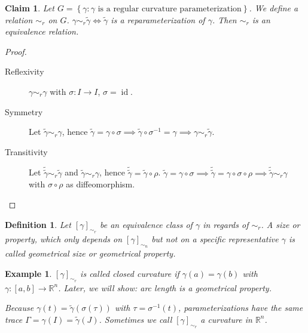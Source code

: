 \documentclass{article}
\newtheorem{example}{Example}  \numberwithin{example}{section}
\newtheorem{definition}{Definition}  \numberwithin{definition}{section}
\newtheorem*{claim}{Claim}%
\newcommand{\set}[1]{\left\{#1\right\}}
\begin{document}
\begin{claim}
  Let $G = \set{\gamma: \gamma \text{ is a regular curvature parameterization}}$.
  We define a relation $\sim_{r}$ on $G$. $\gamma \sim_r \tilde\gamma \iff \tilde\gamma$ is a reparameterization of $\gamma$.
  Then $\sim_r$ is an equivalence relation.
\end{claim}
\begin{proof}
  \begin{description}
    \item[Reflexivity]
      $\gamma \sim_r \gamma$ with $\sigma: I \to I$, $\sigma = \operatorname{id}$. 
    \item[Symmetry]
      Let $\tilde\gamma \sim_r \gamma$, hence $\tilde\gamma = \gamma \circ \sigma \implies \tilde\gamma \circ \sigma^{-1} = \gamma \implies \gamma \sim_r \tilde\gamma$.
    \item[Transitivity]
      Let $\tilde{\tilde\gamma} \sim_r \tilde\gamma$ and $\tilde\gamma \sim_r \gamma$, hence $\tilde{\tilde\gamma} = \tilde\gamma \circ \rho$.
      $\tilde\gamma = \gamma \circ \sigma \implies \tilde{\tilde\gamma} = \gamma \circ \sigma \circ \rho \implies \tilde{\tilde\gamma} \sim_r \gamma$ with $\sigma \circ \rho$ as diffeomorphism.
  \end{description}
\end{proof}

\begin{definition}
  Let $[\gamma]_{\sim_r}$ be an equivalence class of $\gamma$ in regards of $\sim_r$. A size or property, which only depends on $[\gamma]_{\sim_n}$ but not on a specific representative $\gamma$ is called \emph{geometrical size} or \emph{geometrical property}.
\end{definition}

\begin{example}
  $[\gamma]_{\sim_r}$ is called \emph{closed curvature} if $\gamma(a) = \gamma(b)$ with $\gamma: [a,b] \to \mathbb R^n$.
  Later, we will show: arc length is a geometrical property.

  Because $\gamma(t) = \tilde{\gamma}(\sigma(\tau))$ with $\tau = \sigma^{-1}(t)$, parameterizations have the same trace $\Gamma = \gamma(I) = \tilde\gamma(J)$. Sometimes we call $[\gamma]_{\sim_r}$ a curvature in $\mathbb R^n$.
\end{example}
\end{document}
